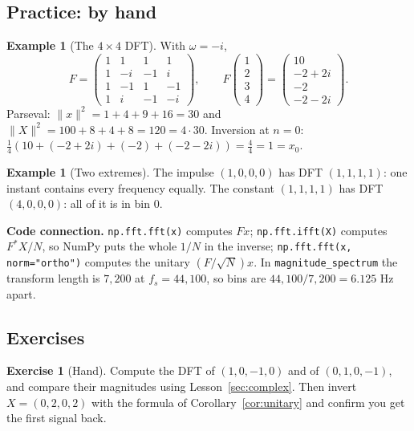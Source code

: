 \documentclass[11pt]{article}
\theoremstyle{definition}
\newtheorem{example}[theorem]{Example}
\newtheorem{innerexercise}{Exercise}[section]
\newenvironment{exercise}[1][]{\begin{innerexercise}[#1]}{\end{innerexercise}}
\newcommand{\norm}[1]{\lVert #1\rVert}
\newcommand{\code}[1]{\texttt{#1}}
\begin{document}
\subsection{Practice: by hand}

\begin{example}[The $4\times4$ DFT]
With $\omega=-i$,
\[
F=\begin{pmatrix}1&1&1&1\\1&-i&-1&i\\1&-1&1&-1\\1&i&-1&-i\end{pmatrix},\qquad
F\begin{pmatrix}1\\2\\3\\4\end{pmatrix}=\begin{pmatrix}10\\-2+2i\\-2\\-2-2i\end{pmatrix}.
\]
Parseval: $\norm x^2=1+4+9+16=30$ and $\norm X^2=100+8+4+8=120=4\cdot30$. Inversion at
$n=0$: $\frac14(10+(-2+2i)+(-2)+(-2-2i))=\frac44=1=x_0$.
\end{example}

\begin{example}[Two extremes]
The impulse $(1,0,0,0)$ has DFT $(1,1,1,1)$: one instant contains every frequency
equally. The constant $(1,1,1,1)$ has DFT $(4,0,0,0)$: all of it is in bin 0.
\end{example}

\begin{connection}
\textbf{Code connection.} \code{np.fft.fft(x)} computes $Fx$; \code{np.fft.ifft(X)}
computes $F^*X/N$, so NumPy puts the whole $1/N$ in the inverse;
\code{np.fft.fft(x, norm="ortho")} computes the unitary $(F/\sqrt N)x$. In
\code{magnitude\_spectrum} the transform length is $7{,}200$ at $f_s=44{,}100$, so
bins are $44{,}100/7{,}200=6.125$ Hz apart.
\end{connection}

\subsection{Exercises}
\begin{exercise}[Hand]\label{ex:dft4}
Compute the DFT of $(1,0,-1,0)$ and of $(0,1,0,-1)$, and compare their magnitudes using
Lesson~\ref{sec:complex}. Then invert $X=(0,2,0,2)$ with the formula of
Corollary~\ref{cor:unitary} and confirm you get the first signal back.
\end{exercise}
\end{document}
